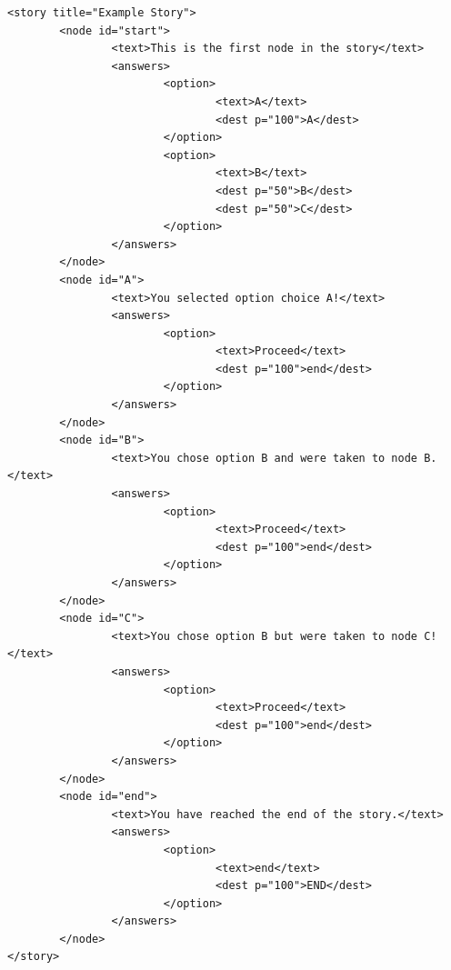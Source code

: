 \documentclass[12pt,letterpaper]{article}
\begin{document}
\begin{lstlisting}[breaklines=true, caption=Example story in XML format.]
<story title="Example Story">
        <node id="start">
                <text>This is the first node in the story</text>
                <answers>
                        <option>
                                <text>A</text>
                                <dest p="100">A</dest>
                        </option>
                        <option>
                                <text>B</text>
                                <dest p="50">B</dest>
                                <dest p="50">C</dest>
                        </option>
                </answers>
        </node>
        <node id="A">
                <text>You selected option choice A!</text>
                <answers>
                        <option>
                                <text>Proceed</text>
                                <dest p="100">end</dest>
                        </option>
                </answers>
        </node>
        <node id="B">
                <text>You chose option B and were taken to node B.</text>
                <answers>
                        <option>
                                <text>Proceed</text>
                                <dest p="100">end</dest>
                        </option>
                </answers>
        </node>
        <node id="C">
                <text>You chose option B but were taken to node C!</text>
                <answers>
                        <option>
                                <text>Proceed</text>
                                <dest p="100">end</dest>
                        </option>
                </answers>
        </node>
        <node id="end">
                <text>You have reached the end of the story.</text>
                <answers>
                        <option>
                                <text>end</text>
                                <dest p="100">END</dest>
                        </option>
                </answers>
        </node>
</story>
\end{lstlisting}
\end{document}
